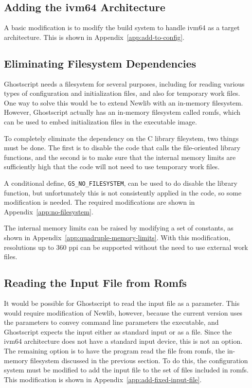 \documentclass[a4paper,11pt]{article}
\begin{document}
\subsection{Adding the ivm64 Architecture}

A basic modification is to modify the build system to handle ivm64 as a target architecture.
This is shown in Appendix~\ref{app:add-to-config}.

\subsection{Eliminating Filesystem Dependencies}

Ghostscript needs a filesystem for several purposes, including for reading various types of configuration and initialization files, and also for temporary work files.
One way to solve this would be to extend Newlib with an in-memory filesystem.
However, Ghostscript actually has an in-memory filesystem called romfs, which can be used to embed initialization files in the executable image.

To completely eliminate the dependency on the C library fileystem, two things must be done.
The first is to disable the code that calls the file-oriented library functions, and the second is to make sure that the internal memory limits are sufficiently high that the code will not need to use temporary work files.

A conditional define, \texttt{GS\_NO\_FILESYSTEM}, can be used to do disable the library function, but unfortunately this is not consistently applied in the code, so some modification is needed.
The required modifications are shown in Appendix~\ref{app:no-filesystem}.

The internal memory limits can be raised by modifying a set of constants, as shown in Appendix~\ref{app:quadruple-memory-limits}.
With this modification, resolutions up to 360 ppi can be supported without the need to use external work files.

\subsection{Reading the Input File from Romfs}

It would be possible for Ghostscript to read the input file as a parameter.
This would require modification of Newlib, however, because the current version uses the parameters to convey command line parameters the executable, and Ghostscript expects the input either as standard input or as a file.
Since the ivm64 architecture does not have a standard input device, this is not an option.
The remaining option is to have the program read the file from romfs, the in-memory filesystem discussed in the previous section.
To do this, the configuration system must be modified to add the input file to the set of files included in romfs.
This modification is shown in Appendix~\ref{app:add-fixed-input-file}.
\end{document}
